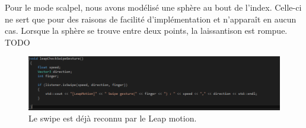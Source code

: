 \documentclass[a4paper,12pt]{article}
\begin{document}
Pour le mode \og{}scalpel\fg{}, nous avons modélisé une sphère au bout de l'index. Celle-ci ne sert que pour des raisons de facilité d'implémentation et n'apparaît en aucun cas. Lorsque la sphère se trouve entre deux points, la laissantison est rompue.
TODO
\begin{figure}
  \centering
  \includegraphics{images/gestes_base2.png}
  \caption{Le swipe est déjà reconnu par le Leap motion.}
  \label{fig:}
\end{figure}
\end{document}
